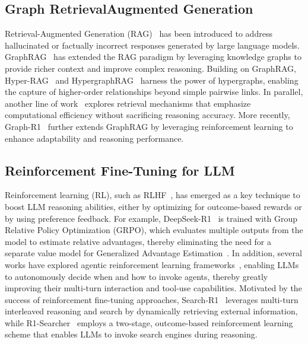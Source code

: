 \subsection{Graph Retrieval{\textendash}Augmented Generation}
Retrieval-Augmented Generation (RAG)~\citep{lewis2020retrieval,jiang2023active, trivedi2023interleaving} has been introduced to address hallucinated or factually incorrect responses generated by large language models.
GraphRAG~\citep{edge2024local} has extended the RAG paradigm by leveraging knowledge graphs to provide richer context and improve complex reasoning.
Building on GraphRAG, 
Hyper-RAG~\citep{feng2025hyper} and HypergraphRAG~\citep{luo2025hypergraphrag} harness the power of hypergraphs, enabling the capture of higher-order relationships beyond simple pairwise links.
In parallel, another line of work~\citep{chen2025pathrag,guo2025lightrag,gutierrez2025rag,wang2025causalrag,xu2025noderag}  explores retrieval mechanisms that emphasize computational efficiency without sacrificing reasoning accuracy.
More recently, Graph-R1~\citep{luo2025graph} further extends GraphRAG by leveraging reinforcement learning to enhance adaptability and reasoning performance.


\subsection{Reinforcement Fine-Tuning for LLM}
Reinforcement learning (RL), such as RLHF~\citep{ouyang2022training}, has emerged as a key technique to boost LLM reasoning abilities, either by optimizing for outcome-based rewards or by using preference feedback. 
For example, DeepSeek-R1~\citep{guo2025deepseek} is trained with Group Relative Policy Optimization (GRPO), which evaluates multiple outputs from the model to estimate relative advantages, thereby eliminating the need for a separate value model for Generalized Advantage Estimation~\citep{schulman2015high}.
In addition, several works have explored agentic reinforcement learning frameworks~\citep{zheng2026deepeyes,feng2025group,zeng2025reinforcing}, enabling LLMs to autonomously decide when and how to invoke agents, thereby greatly improving their multi-turn interaction and tool-use capabilities.
Motivated by the success of reinforcement fine-tuning approaches, Search-R1~\citep{jin2025search} leverages multi-turn interleaved reasoning and search by dynamically retrieving external information, while R1-Searcher~\citep{song2025r1} employs a two-stage, outcome-based reinforcement learning scheme that enables LLMs to invoke search engines during reasoning.